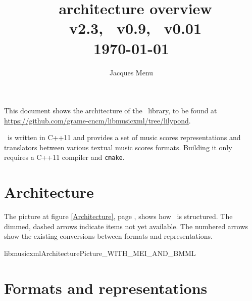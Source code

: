 \documentclass[12pt,a4paper]{article}
\begin{document}

\def \tab {~~~}


\title{
\lib\ architecture overview \\[5pt]
{\normalsize 
  \xmlToGuido\ v2.3, \xmlToLy\ v0.9, \xmlToBrl\ v0.01\\
  \today
}
}

\author{
Jacques Menu 
}

\date {}

\maketitle
\thispagestyle{fancy} %

{
	\small
	\tableofcontents
}

This document shows the architecture of the \lib\ library, to be found at 
\url {https://github.com/grame-cncm/libmusicxml/tree/lilypond}.

\lib\ is written in C++11 and provides a set of music scores representations and translators between various textual music scores formats. Building it only requires a C++11 compiler and {\tt cmake}.


\section{Architecture}

The picture at figure \ref {Architecture}, page \pageref {Architecture}, shows how \lib\ is structured. The dimmed, dashed arrows indicate items not yet available. 
The numbered arrows show the existing conversions between formats and representations.

 {libmusicxmlArchitecturePicture_WITH_MEI_AND_BMML}



\section{Formats and representations}
\end{document}
